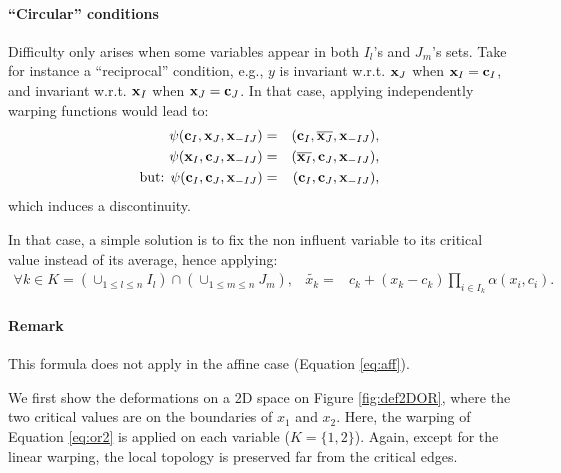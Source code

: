 \paragraph{``Circular'' conditions}
Difficulty only arises when some variables appear in both $I_l$'s and $J_m$'s sets. Take for instance a ``reciprocal'' condition, 
e.g., $y$ is invariant w.r.t. $\mathbf{x}_J$ when $\mathbf{x}_I=\mathbf{c}_I$, and invariant w.r.t. $\mathbf{x}_I$ when $\mathbf{x}_J=\mathbf{c}_J$.
In that case, applying independently warping functions would lead to: 
\begin{eqnarray*}
 \psi(\mathbf{c}_I, \mathbf{x}_J, \mathbf{x}_{-IJ}) &=& (\mathbf{c}_I, \overline{\mathbf{x}_J}, \mathbf{x}_{-IJ}),\\
 \psi(\mathbf{x}_I, \mathbf{c}_J, \mathbf{x}_{-IJ}) &=& (\overline{\mathbf{x}_I}, \mathbf{c}_J, \mathbf{x}_{-IJ}),\\
 \text{but: } \psi(\mathbf{c}_I, \mathbf{c}_J, \mathbf{x}_{-IJ}) &=& (\mathbf{c}_I, \mathbf{c}_J, \mathbf{x}_{-IJ}),
\end{eqnarray*}
which induces a discontinuity.

In that case, a simple solution is to fix the non influent variable to its critical value instead of its average, hence applying:
\begin{eqnarray}
 \forall k \in K= \left( \cup_{1 \leq l \leq n} I_l \right) \cap \left(\cup_{1 \leq m \leq n} J_m \right), &\widetilde{x_k} =& c_k + \left( x_k - c_k\right) \prod_{i \in I_k} \alpha(x_i, c_{i})\label{eq:or2}.
\end{eqnarray}

\paragraph{Remark} This formula does not apply in the affine case (Equation \ref{eq:aff}).

We first show the deformations on a 2D space on Figure \ref{fig:def2DOR}, where the two critical values are on the boundaries of $x_1$ and $x_2$.
Here, the warping of Equation \ref{eq:or2} is applied on each variable ($K=\{1,2\}$). 
Again, except for the linear warping, the local topology is preserved far from the critical edges. 

